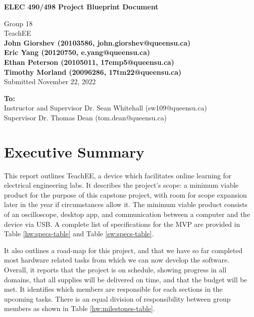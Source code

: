\documentclass[letterpaper,12pt]{article}
\begin{document}
\begin{titlepage}
    \begin{center}
        \vspace*{1cm}

        \Large
        \textbf{ELEC 490/498 Project Blueprint Document}

        \vspace{0.5cm}
        Group 18\\
        TeachEE\\
        \vspace{0.5cm}
        \normalsize
        \textbf{John Giorshev (20103586, john.giorshev@queensu.ca) \\ Eric Yang (20120750, e.yang@queensu.ca) \\ Ethan Peterson (20105011, 17emp5@queensu.ca) \\ Timothy Morland (20096286, 17tm22@queensu.ca)}\\
        \vspace{0.5cm}
        Submitted November 22, 2022\\

        \vfill
            
        \textbf{To:}\\
        Instructor and Supervisor Dr. Sean Whitehall (sw109@queensu.ca) \\
        Supervisor Dr. Thomas Dean (tom.dean@queensu.ca) \\
            
        \vspace{1.8cm}

    \end{center}
\end{titlepage}
\section{Executive Summary}

This report outlines TeachEE, a device which facilitates online learning for
electrical engineering labs. It describes the project's scope: a minimum viable
product for the purpose of this capstone project, with room for scope expansion
later in the year if circumstances allow it. The minimum viable product consists
of an oscilloscope, desktop app, and communication between a computer and the
device via USB. A complete list of specifications for the MVP are provided in
Table \ref{hw:specs-table} and Table \ref{sw:specs-table}.

It also outlines a road-map for this project, and that we have so far completed
most hardware related tasks from which we can now develop the software. Overall,
it reports that the project is on schedule, showing progress in all domains,
that all supplies will be delivered on time, and that the budget will be met. It
identifies which members are responsible for each sections in the upcoming
tasks. There is an equal division of responsibility between group members as
shown in Table \ref{hw:milestones-table}.
\end{document}
